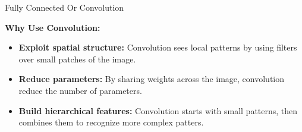 \documentclass[default, aspectratio=169]{beamer}
\begin{document}
	\begin{frame}{Fully Connected Or Convolution}
		
		\textbf{Why Use Convolution:}
		\begin{itemize}
			\item \textbf{Exploit spatial structure:} Convolution sees local patterns by using filters over small patches of the image.
			\item \textbf{Reduce parameters:} By sharing weights across the image, convolution reduce the number of parameters.
			\item \textbf{Build hierarchical features:} Convolution starts with small patterns, then combines them to recognize more complex patters.
		\end{itemize}
		
	\end{frame}
\end{document}
